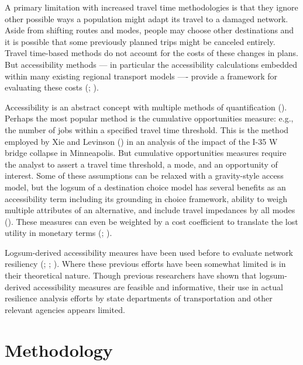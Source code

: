 \documentclass[]{ascelike-new}
\begin{document}
A primary limitation with increased travel time methodologies is that
they ignore other possible ways a population might adapt its travel to a
damaged network. Aside from shifting routes and modes, people may choose
other destinations and it is possible that some previously planned trips
might be canceled entirely. Travel time-based methods do not account for
the costs of these changes in plans. But accessibility methods --- in
particular the accessibility calculations embedded within many existing
regional transport models ---- provide a framework for evaluating these
costs (;
).

Accessibility is an abstract concept with multiple methods of
quantification ().
Perhaps the most popular method is the cumulative opportunities measure:
e.g., the number of jobs within a specified travel time threshold. This
is the method employed by Xie and Levinson () in an analysis of the impact of the I-35 W bridge
collapse in Minneapolis. But cumulative opportunities measures require
the analyst to assert a travel time threshold, a mode, and an
opportunity of interest. Some of these assumptions can be relaxed with a
gravity-style access model, but the logsum of a destination choice model
has several benefits as an accessibility term including its grounding in
choice framework, ability to weigh multiple attributes of an
alternative, and include travel impedances by all modes
(). These measures can even be
weighted by a cost coefficient to translate the lost utility in monetary
terms (;
).

Logsum-derived accessibility meaures have been used before to evaluate
network resiliency (;
;
). Where these previous efforts
have been somewhat limited is in their theoretical nature. Though
previous researchers have shown that logsum-derived accessibility
measures are feasible and informative, their use in actual resilience
analysis efforts by state departments of transportation and other
relevant agencies appears limited.


\section{Methodology}\label{methodology}
\end{document}
